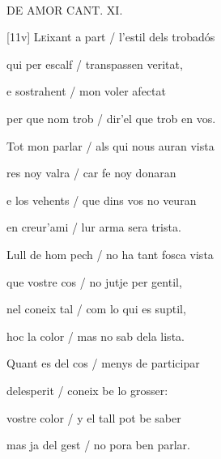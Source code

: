 \documentclass[12pt]{article}
\renewcommand{\espaiAbansEtiquetaPoema}{\vspace{0ex}}
\begin{document}
\begin{estrofa}

\espaiAbansEtiquetaPoema

\\

\begin{rubrica}

DE AMOR CANT. XI.

\end{rubrica} 

\end{estrofa}


\begin{estrofa}

 [11v] L\textsc{e}ixant a part / l'estil dels trobad\'{o}s

 qui per escalf / transpassen veritat,

 e sostrahent / mon voler afectat

 per que nom trob / dir'el que trob en vos.

 Tot mon parlar / als qui nous auran vista

 res noy valra / car fe noy donaran

 e los vehents / que dins vos no veuran

 en creur'ami / lur arma sera trista.

\end{estrofa}



\begin{estrofa}

 Lull de hom pech / no ha tant fosca vista

 que vostre cos / no jutje per gentil,

 nel coneix tal / com lo qui es suptil,

 hoc la color / mas no sab dela lista.

 Quant es del cos / menys de participar

 delesperit / coneix be lo grosser:

 vostre color / y el tall pot be saber

 mas ja del gest / no pora ben parlar.

\end{estrofa}
\end{document}
